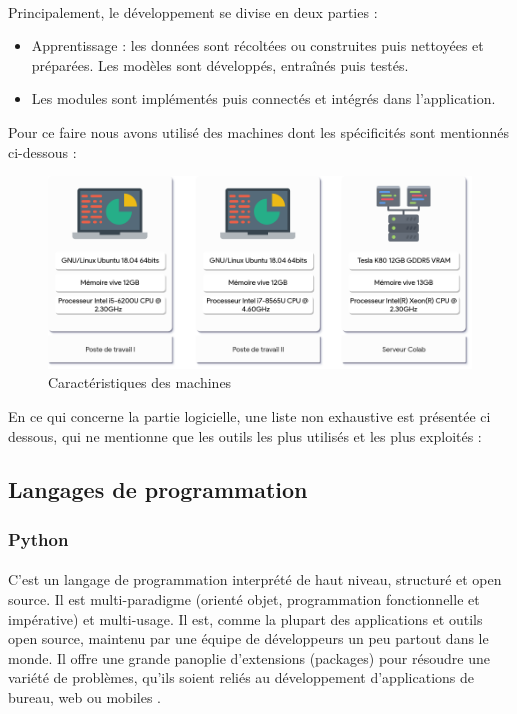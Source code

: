 	\paragraph{}
	Principalement, le développement se divise en deux parties : 
	\begin{itemize}
		\item Apprentissage : les données sont récoltées ou construites puis nettoyées et préparées. Les modèles sont développés, entraînés puis testés.
		\item Les modules sont implémentés puis connectés et intégrés dans l'application.
	\end{itemize}
	\par Pour ce faire nous avons utilisé des machines dont les spécificités sont mentionnés ci-dessous :
	\begin{figure}[H] 
		\centering
		\includegraphics[width=0.88\linewidth]{images/implementation/machines.png}
		\caption{Caractéristiques des machines}
		\label{fig:machines}
		
	\end{figure}
	\par
	En ce qui concerne la partie logicielle, une liste non exhaustive est présentée ci dessous, qui ne mentionne que les outils les plus utilisés et les plus exploités :
	\subsection{Langages de programmation}
		\subsubsection*{Python}
		\label{python}
		\paragraph{}
		 C'est un langage de programmation interprété de haut niveau, structuré et open source. Il est multi-paradigme (orienté objet, programmation fonctionnelle et impérative) et multi-usage. Il est, comme la plupart des applications et outils open source, maintenu par une équipe de développeurs un peu partout dans le monde. Il offre une grande panoplie d'extensions (packages) pour résoudre une variété de problèmes, qu'ils soient reliés au développement d'applications de bureau, web ou mobiles \cite{python}.
		
